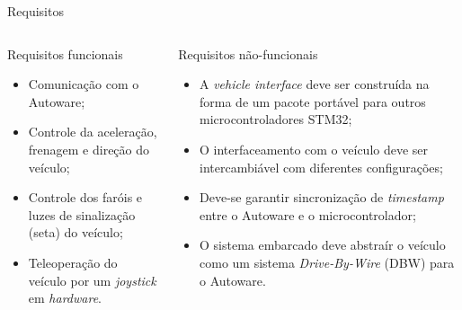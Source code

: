 \documentclass{if-beamer}
\begin{document}
\begin{frame}{Requisitos}
	
	\begin{columns}
		
		\begin{column}{0.5\textwidth}
			
			\begin{block}{Requisitos funcionais}
				
				\begin{itemize}
					\item Comunicação com o Autoware;
					\item Controle da aceleração, frenagem e direção do veículo;
					\item Controle dos faróis e luzes de sinalização (seta) do veículo;
					\item Teleoperação do veículo por um \textit{joystick} em  \textit{hardware}.
					
				\end{itemize}
				
			\end{block}
			
		\end{column}
		
		\begin{column}{0.5\textwidth}
			
			\begin{block}{Requisitos não-funcionais}
				
				\begin{itemize}
					\item A \textit{vehicle interface} deve ser construída na forma de um pacote portável para outros microcontroladores STM32;
					\item O interfaceamento com o veículo deve ser intercambiável com diferentes configurações;
					\item Deve-se garantir sincronização de \textit{timestamp} entre o Autoware e o microcontrolador;
					\item O sistema embarcado deve abstraír o veículo como um sistema \textit{Drive-By-Wire} (DBW) para o Autoware.
				\end{itemize}
				
			\end{block}
			
		\end{column}
		
	\end{columns}
	
	
\end{frame}
\end{document}
